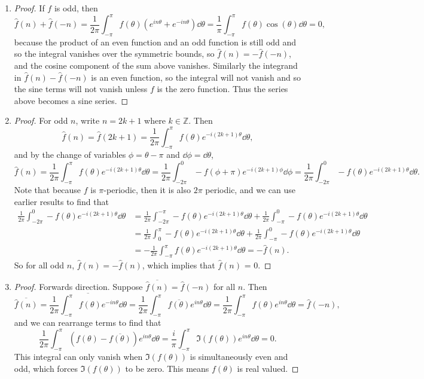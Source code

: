 \documentclass[11pt]{article}
\newcommand{\br}[1]{\left(#1\right)}
\begin{document}
\begin{enumerate}[label=(\alph*)]
\begin{proof}
    \end{proof}
    \item \begin{proof}
        If $f$ is odd, then \[\hat{f}(n)+\hat{f}(-n) = \frac{1}{2\pi}\int_{-\pi}^{\pi}f(\theta)\br{e^{in\theta}+e^{-in\theta}}\dd{\theta} = \frac{1}{\pi}\int_{-\pi}^{\pi}f(\theta)\cos(\theta)\dd{\theta} = 0,\] because the product of an even function and an odd function is still odd and so the integral vanishes over the symmetric bounds, so $\hat{f}(n)=-\hat{f}(-n)$, and the cosine component of the sum above vanishes. Similarly the integrand in $\hat{f}(n)-\hat{f}(-n)$ is an even function, so the integral will not vanish and so the sine terms will not vanish unless $f$ is the zero function. Thus the series above becomes a sine series.
    \end{proof}
    \item \begin{proof}
        For odd $n$, write $n= 2k+1$ where $k\in\mathbb{Z}$. Then \[\hat{f}(n) = \hat{f}(2k+1) = \frac{1}{2\pi}\int_{-\pi}^{\pi}f(\theta)e^{-i(2k+1)\theta}\dd{\theta},\] and by the change of variables $\phi = \theta -\pi$ and $\dd{\phi} = \dd{\theta}$, \[\hat{f}(n) = \frac{1}{2\pi}\int_{-\pi}^{\pi}f(\theta)e^{-i(2k+1)\theta}\dd{\theta} = \frac{1}{2\pi}\int_{-2\pi}^{0}-f(\phi+\pi)e^{-i(2k+1)\phi}\dd{\phi} = \frac{1}{2\pi}\int_{-2\pi}^{0}-f(\theta)e^{-i(2k+1)\theta}\dd{\theta}.\] Note that because $f$ is $\pi$-periodic, then it is also $2\pi$ periodic, and we can use earlier results to find that \begin{align*}\frac{1}{2\pi}\int_{-2\pi}^{0}-f(\theta)e^{-i(2k+1)\theta}\dd{\theta} &= \frac{1}{2\pi}\int_{-2\pi}^{-\pi}-f(\theta)e^{-i(2k+1)\theta}\dd{\theta}+ \frac{1}{2\pi}\int_{-\pi}^{0}-f(\theta)e^{-i(2k+1)\theta}\dd{\theta} \\ &= \frac{1}{2\pi}\int_{0}^{\pi}-f(\theta)e^{-i(2k+1)\theta}\dd{\theta}+ \frac{1}{2\pi}\int_{-\pi}^{0}-f(\theta)e^{-i(2k+1)\theta}\dd{\theta} \\ &= -\frac{1}{2\pi}\int_{-\pi}^{\pi}f(\theta)e^{-i(2k+1)\theta}\dd{\theta} = -\hat{f}(n).\end{align*} So for all odd $n$, $\hat{f}(n) = -\hat{f}(n)$, which implies that $\hat{f}(n)$ = $0$.
    \end{proof}
    \item \begin{proof}
        Forwards direction. Suppose $\overline{\hat{f}(n)} = \hat{f}(-n)$ for all $n$. Then \[\overline{\hat{f}(n)} = \overline{\frac{1}{2\pi}\int_{-\pi}^{\pi}f(\theta)e^{-in\theta}\dd{\theta}} = \frac{1}{2\pi}\int_{-\pi}^{\pi}\overline{f(\theta)}e^{in\theta}\dd{\theta} = \frac{1}{2\pi}\int_{-\pi}^{\pi}f(\theta)e^{in\theta}\dd{\theta} = \hat{f}(-n),\] and we can rearrange terms to find that \[\frac{1}{2\pi}\int_{-\pi}^{\pi}\br{f(\theta)-\overline{f(\theta)}}e^{in\theta}\dd{\theta} = \frac{i}{\pi}\int_{-\pi}^{\pi}\Im(f(\theta))e^{in\theta}\dd{\theta} = 0.\] This integral can only vanish when $\Im(f(\theta))$ is simultaneously even and odd, which forces $\Im(f(\theta))$ to be zero. This means $f(\theta)$ is real valued.
    \end{proof}
\end{enumerate}
\end{document}
